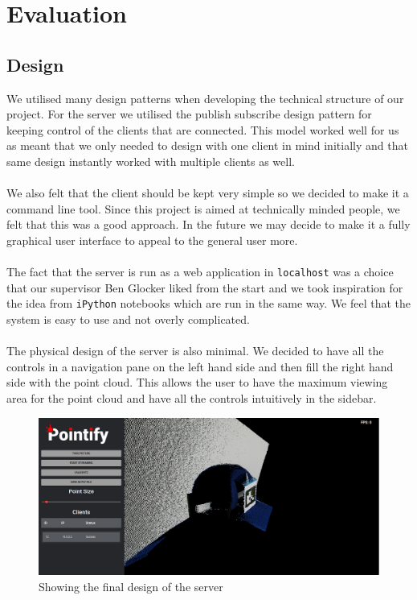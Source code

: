 \documentclass{article}
\begin{document}
\newpage
\section{Evaluation}
\subsection{Design}
We utilised many design patterns when developing the technical structure of our project. For the server we utilised the publish subscribe design pattern for keeping control of the clients that are connected. This model worked well for us as meant that we only needed to design with one client in mind initially and that same design instantly worked with multiple clients as well.
\\\\
We also felt that the client should be kept very simple so we decided to make it a command line tool. Since this project is aimed at technically minded people, we felt that this was a good approach. In the future we may decide to make it a fully graphical user interface to appeal to the general user more.
\\\\
The fact that the server is run as a web application in \texttt{localhost} was a choice that our supervisor Ben Glocker liked from the start and we took inspiration for the idea from \texttt{iPython} \cite{ipython} notebooks which are run in the same way. We feel that the system is easy to use and not overly complicated.
\\\\
The physical design of the server is also minimal. We decided to have all the controls in a navigation pane on the left hand side and then fill the right hand side with the point cloud. This allows the user to have the maximum viewing area for the point cloud and have all the controls intuitively in the sidebar.
\begin{figure}[h]
  \centering
  \includegraphics[scale=0.2]{serverdesign}
  \caption{Showing the final design of the server}
\end{figure}
\end{document}
